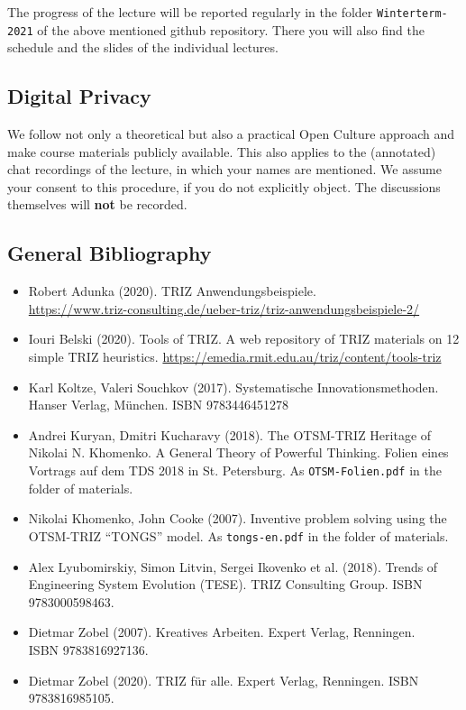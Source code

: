 \documentclass[11pt,a4paper]{article}
\begin{document}
The progress of the lecture will be reported regularly in the folder
\texttt{Winterterm-2021} of the above mentioned github repository. There you
will also find the schedule and the slides of the individual lectures.

\subsection{Digital Privacy}

We follow not only a theoretical but also a practical Open Culture approach
and make course materials publicly available.  This also applies to the
(annotated) chat recordings of the lecture, in which your names are mentioned.
We assume your consent to this procedure, if you do not explicitly object.
The discussions themselves will \textbf{not} be recorded.

\subsection{General Bibliography}

\begin{itemize}[noitemsep]
\item Robert Adunka (2020). TRIZ Anwendungsbeispiele. \\
  \url{https://www.triz-consulting.de/ueber-triz/triz-anwendungsbeispiele-2/} 
\item Iouri Belski (2020). Tools of TRIZ. A web repository of TRIZ materials
  on 12 simple TRIZ heuristics.
  \url{https://emedia.rmit.edu.au/triz/content/tools-triz}
\item Karl Koltze, Valeri Souchkov (2017). Systematische Innovationsmethoden.
  Hanser Verlag, München. ISBN 9783446451278
\item Andrei Kuryan, Dmitri Kucharavy (2018). The OTSM-TRIZ Heritage of
  Nikolai N. Khomenko. A General Theory of Powerful Thinking. Folien eines
  Vortrags auf dem TDS 2018 in St. Petersburg. As \texttt{OTSM-Folien.pdf} in
  the folder of materials.
\item Nikolai Khomenko, John Cooke (2007). Inventive problem solving using the
  OTSM-TRIZ “TONGS” model.  As \texttt{tongs-en.pdf} in the folder of
  materials.
\item Alex Lyubomirskiy, Simon Litvin, Sergei Ikovenko et al. (2018). Trends
  of Engineering System Evolution (TESE).  TRIZ Consulting Group. ISBN
  9783000598463.
\item Dietmar Zobel (2007). Kreatives Arbeiten. Expert Verlag, Renningen.\\
  ISBN 9783816927136.
\item Dietmar Zobel (2020). TRIZ für alle. Expert Verlag, Renningen. ISBN
  9783816985105.
\end{itemize}
\end{document}
